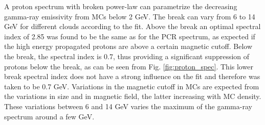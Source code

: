 A proton spectrum with broken power-law can parametrize the decreasing gamma-ray emissivity from MCs below 2 GeV. The break can vary from 6 to 14 GeV for different clouds according to the fit. Above the break an optimal spectral index of 2.85 was found to be the same as for the PCR spectrum, as expected if the high energy propagated protons are above a certain magnetic cutoff. Below the break, the spectral index is 0.7, thus providing a significant suppression of protons below the break, as can be seen from Fig. \ref{fig:proton_spec}. This lower break spectral index does not have a strong influence on the fit and therefore was taken to be 0.7 GeV.
Variations in the magnetic cutoff in MCs are expected from the variations in size and in magnetic field, the latter increasing with MC density. %
These variations between 6 and 14 GeV varies the maximum of the gamma-ray spectrum around a few GeV.

